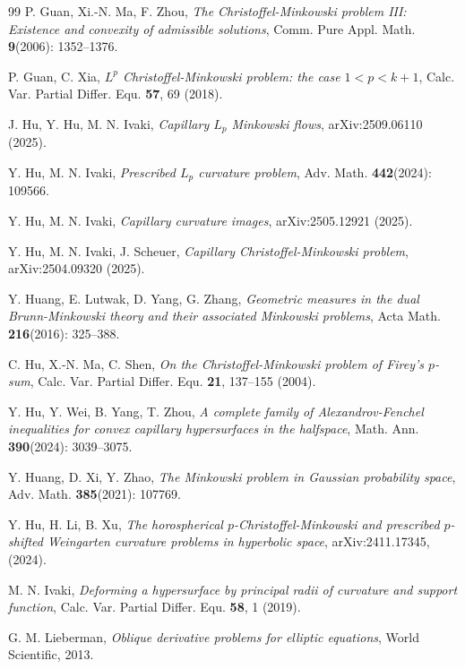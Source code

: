 \documentclass[12pt]{amsart}
\numberwithin{equation}{section}
\newcommand{\8}{\infty}
\begin{document}
\begin{thebibliography}{99}
P. Guan, Xi.-N. Ma, F. Zhou, \textit{The Christoffel-Minkowski problem III: Existence and convexity of admissible solutions}, Comm. Pure Appl. Math.  \textbf{9}(2006): 1352--1376.

P. Guan, C. Xia, \textit{$L^p$ Christoffel-Minkowski problem: the case $1<p<k+1$}, Calc. Var. Partial Differ. Equ. \textbf{57}, 69 (2018).

J. Hu, Y. Hu, M. N. Ivaki, \textit{Capillary $L_p$ Minkowski flows}, arXiv:2509.06110 (2025).

 Y. Hu, M. N. Ivaki, \textit{Prescribed $L_p$ curvature problem}, Adv. Math.  \textbf{442}(2024): 109566.

Y. Hu, M. N. Ivaki, \textit{Capillary curvature images}, arXiv:2505.12921 (2025).

Y. Hu, M. N. Ivaki, J. Scheuer, \textit{Capillary Christoffel-Minkowski problem}, arXiv:2504.09320 (2025).

Y. Huang, E. Lutwak, D. Yang, G. Zhang, \textit{Geometric measures in the dual Brunn-Minkowski theory and their associated Minkowski problems}, Acta Math. \textbf{216}(2016): 325--388.

C. Hu, X.-N. Ma, C. Shen, \textit{On the Christoffel-Minkowski problem of Firey's $p$-sum}, Calc. Var. Partial Differ. Equ. \textbf{21}, 137--155 (2004).

Y. Hu, Y. Wei, B. Yang, T. Zhou, \textit{A complete family of Alexandrov-Fenchel inequalities for convex capillary hypersurfaces in the halfspace}, Math. Ann. \textbf{390}(2024): 3039--3075.

Y. Huang, D. Xi, Y. Zhao, \textit{The Minkowski problem in Gaussian probability space}, Adv. Math. \textbf{385}(2021): 107769.

Y. Hu, H. Li, B. Xu, \textit{The horospherical $p$-Christoffel-Minkowski and prescribed $p$-shifted Weingarten curvature problems in hyperbolic space}, arXiv:2411.17345, (2024).

M. N. Ivaki, \textit{Deforming a hypersurface by principal radii of curvature and support function}, Calc. Var. Partial Differ. Equ. \textbf{58}, 1 (2019).

G. M. Lieberman, \textit{Oblique derivative problems for elliptic equations}, World Scientific, 2013.


\end{thebibliography}
\end{document}
